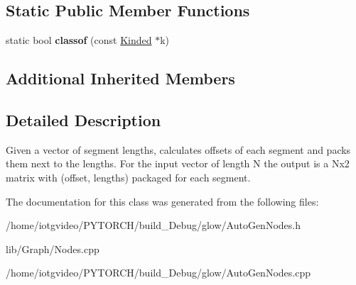 \subsection*{Static Public Member Functions}
\begin{DoxyCompactItemize}
\item 
\mbox{\label{classglow_1_1_lengths_to_ranges_node_a6333ccfdcd5028a3c9ed761774f09c80}} 
static bool {\bfseries classof} (const \hyperlink{classglow_1_1_kinded}{Kinded} $\ast$k)
\end{DoxyCompactItemize}
\subsection*{Additional Inherited Members}


\subsection{Detailed Description}
Given a vector of segment lengths, calculates offsets of each segment and packs them next to the lengths. For the input vector of length N the output is a Nx2 matrix with (offset, lengths) packaged for each segment. 

The documentation for this class was generated from the following files\+:\begin{DoxyCompactItemize}
\item 
/home/iotgvideo/\+P\+Y\+T\+O\+R\+C\+H/build\+\_\+\+Debug/glow/Auto\+Gen\+Nodes.\+h\item 
lib/\+Graph/Nodes.\+cpp\item 
/home/iotgvideo/\+P\+Y\+T\+O\+R\+C\+H/build\+\_\+\+Debug/glow/Auto\+Gen\+Nodes.\+cpp\end{DoxyCompactItemize}

